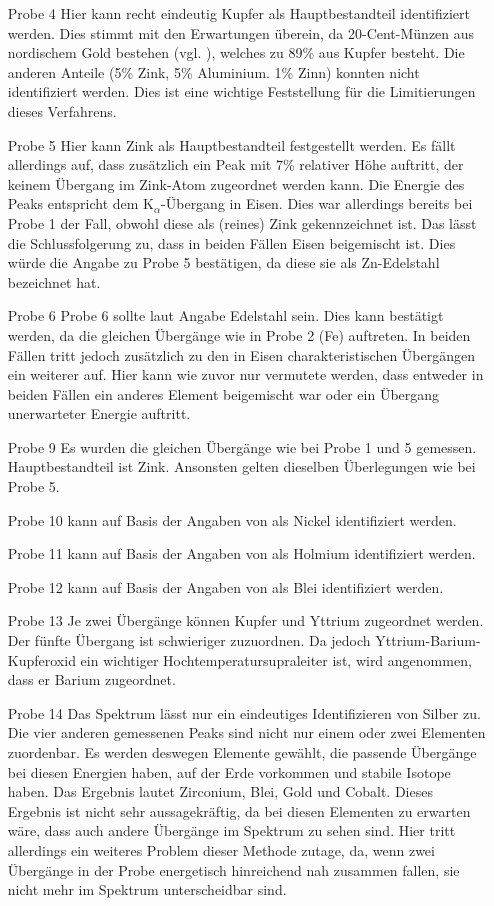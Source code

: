 \documentclass[
	a4paper,
	12pt,
	pagesize,
	ngerman
]{scrartcl}
\begin{document}
	\begin{enumerate}
		\item[Probe 4] Hier kann recht eindeutig Kupfer als Hauptbestandteil identifiziert werden. Dies stimmt mit den Erwartungen überein, da 20-Cent-Münzen aus nordischem Gold bestehen (vgl. \cite{muenzen}), welches zu 89\% aus Kupfer besteht. Die anderen Anteile (5\% Zink, 5\% Aluminium. 1\% Zinn) konnten nicht identifiziert werden. Dies ist eine wichtige Feststellung für die Limitierungen dieses Verfahrens.
		\item[Probe 5] Hier kann Zink als Hauptbestandteil festgestellt werden. Es fällt allerdings auf, dass zusätzlich ein Peak mit 7\% relativer Höhe auftritt, der keinem Übergang im Zink-Atom zugeordnet werden kann. Die Energie des Peaks entspricht dem $\text{K}_\alpha$-Übergang in Eisen. Dies war allerdings bereits bei Probe 1 der Fall, obwohl diese als (reines) Zink gekennzeichnet ist. Das lässt die Schlussfolgerung zu, dass in beiden Fällen Eisen beigemischt ist. Dies würde die Angabe zu Probe 5 bestätigen, da diese sie als Zn-Edelstahl bezeichnet hat.
		\item[Probe 6] Probe 6 sollte laut Angabe Edelstahl sein. Dies kann bestätigt werden, da die gleichen Übergänge wie in Probe 2 (Fe) auftreten. In beiden Fällen tritt jedoch zusätzlich zu den in Eisen charakteristischen Übergängen ein weiterer auf. Hier kann wie zuvor nur vermutete werden, dass entweder in beiden Fällen ein anderes Element beigemischt war oder ein Übergang unerwarteter Energie auftritt.
		\item[Probe 9] Es wurden die gleichen Übergänge wie bei Probe 1 und 5 gemessen. Hauptbestandteil ist Zink. Ansonsten gelten dieselben Überlegungen wie bei Probe 5.
		\item[Probe 10] kann auf Basis der Angaben von \cite{XRAYDB} als Nickel identifiziert werden.
		\item[Probe 11] kann auf Basis der Angaben von \cite{XRAYDB} als Holmium identifiziert werden.
		\item[Probe 12] kann auf Basis der Angaben von \cite{XRAYDB} als Blei identifiziert werden.
		\item[Probe 13] Je zwei Übergänge können Kupfer und Yttrium zugeordnet werden. Der fünfte Übergang ist schwieriger zuzuordnen. Da jedoch Yttrium-Barium-Kupferoxid ein wichtiger Hochtemperatursupraleiter ist, wird angenommen, dass er Barium zugeordnet. %
		\item[Probe 14] Das Spektrum lässt nur ein eindeutiges Identifizieren von Silber zu. Die vier anderen gemessenen Peaks sind nicht nur einem oder zwei Elementen zuordenbar. Es werden deswegen Elemente gewählt, die passende Übergänge bei diesen Energien haben, auf der Erde vorkommen und stabile Isotope haben. Das Ergebnis lautet Zirconium, Blei, Gold und Cobalt. Dieses Ergebnis ist nicht sehr aussagekräftig, da bei diesen Elementen zu erwarten wäre, dass auch andere Übergänge im Spektrum zu sehen sind. Hier tritt allerdings ein weiteres Problem dieser Methode zutage, da, wenn zwei Übergänge in der Probe energetisch hinreichend nah zusammen fallen, sie nicht mehr im Spektrum unterscheidbar sind.

\end{enumerate}
\end{document}
